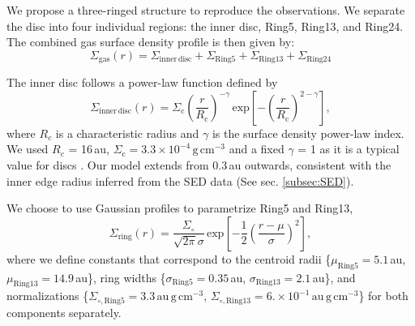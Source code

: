 \documentclass[fleqn,usenatbib,useAMS]{mnras}
\begin{document}
We propose a three-ringed structure to reproduce the observations. We separate the disc into four individual regions: the inner disc, Ring5, Ring13, and Ring24. The combined gas surface density profile is then given by:
\begin{equation}
  \Sigma_{\mathrm{gas}}(r) = \Sigma_{\mathrm{inner\,disc}} + \Sigma_{\mathrm{Ring5}} + \Sigma_{\mathrm{Ring13}} + \Sigma_{\mathrm{Ring24}}
\end{equation}

The inner disc follows a power-law function defined by
\begin{equation}
  \Sigma_{\mathrm{inner\,disc}}(r) =\Sigma_\mathrm{c} \left(\frac{r}{R_\mathrm{c}}\right)^{-\gamma}  \, \mathrm{exp}\left[-\left(\frac{r}{R_\mathrm{c}}\right)^{2-\gamma}\right],
\end{equation}
where $R_c$ is a characteristic radius and $\gamma$ is the surface density power-law index. We used $R_c$ = 16\,au, $\Sigma_\mathrm{c} =3.3\times10^{-4}$\,$\mathrm{g\,cm^{-3}}$ and a fixed $\gamma$ = 1 as it is a typical value for discs \citep{Andrews_2009,Andrews_2010}. Our model extends from 0.3\,au outwards, consistent with the inner edge radius inferred from the SED data (See sec. \ref{subsec:SED}).

We choose to use Gaussian profiles to parametrize Ring5 and Ring13,
\begin{equation}
  \Sigma_{\mathrm{ring}}(r) = \frac{\Sigma_\circ}{\sqrt{2 \pi} \sigma}
  \, \mathrm{exp}\left[-\frac{1}{2}\left(\frac{r-\mu}{\sigma}\right)^{2}\right],
\end{equation}
where we define constants that correspond to the centroid radii \{$\mu_{\mathrm{Ring5}}=5.1$\,au, $\mu_{\mathrm{Ring13}}=14.9$\,au\}, ring widths \{$\sigma_{\mathrm{Ring5}}=0.35$\,au, $\sigma_{\mathrm{Ring13}}=2.1$\,au\}, and normalizations \{$\Sigma_{\circ,\mathrm{Ring5}}=3.3$\,$\mathrm{au\,g\,cm^{-3}}$, $\Sigma_{\circ,\mathrm{Ring13}}=6. \times 10^{-1}$\,$\mathrm{au\,g\,cm^{-3}}$\} for both components separately.
\end{document}

